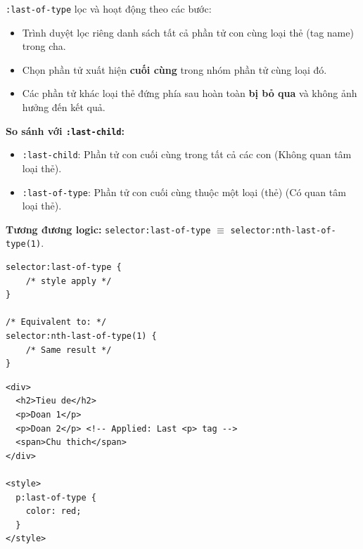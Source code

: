 \documentclass[11pt,oneside]{book}
\newcommand{\codeinline}[1]{\textcolor{accentOrange}{\texttt{#1}}}
\begin{document}
\begin{conceptBox}
\codeinline{:last-of-type} lọc và hoạt động theo các bước:
\begin{itemize}[leftmargin=1.5em, itemsep=2pt, parsep=0pt]
    \item Trình duyệt lọc riêng danh sách tất cả phần tử con cùng loại thẻ (tag name) trong cha.
    \item Chọn phần tử xuất hiện \textbf{cuối cùng} trong nhóm phần tử cùng loại đó.
    \item Các phần tử khác loại thẻ đứng phía sau hoàn toàn \textbf{bị bỏ qua} và không ảnh hưởng đến kết quả.
\end{itemize}
\par\vspace{4pt}
\textbf{So sánh với \codeinline{:last-child}:}
\begin{itemize}[leftmargin=1.5em, itemsep=2pt, parsep=0pt]
    \item \codeinline{:last-child}: Phần tử con cuối cùng trong tất cả các con (Không quan tâm loại thẻ).
    \item \codeinline{:last-of-type}: Phần tử con cuối cùng thuộc một loại (thẻ) (Có quan tâm loại thẻ).
\end{itemize}
\par\vspace{4pt}
\textbf{Tương đương logic:} \codeinline{selector:last-of-type} $\equiv$ \codeinline{selector:nth-last-of-type(1)}.
\end{conceptBox}

\begin{codeWindow}
\begin{lstlisting}[language=CSS3]
selector:last-of-type {
    /* style apply */
}

/* Equivalent to: */
selector:nth-last-of-type(1) {
    /* Same result */
}
\end{lstlisting}
\end{codeWindow}

\begin{codeWindow}
\begin{lstlisting}[language=HTML5]
<div>
  <h2>Tieu de</h2>
  <p>Doan 1</p>
  <p>Doan 2</p> <!-- Applied: Last <p> tag -->
  <span>Chu thich</span>
</div>

<style>
  p:last-of-type {
    color: red;
  }
</style>
\end{lstlisting}
\end{codeWindow}
\end{document}
